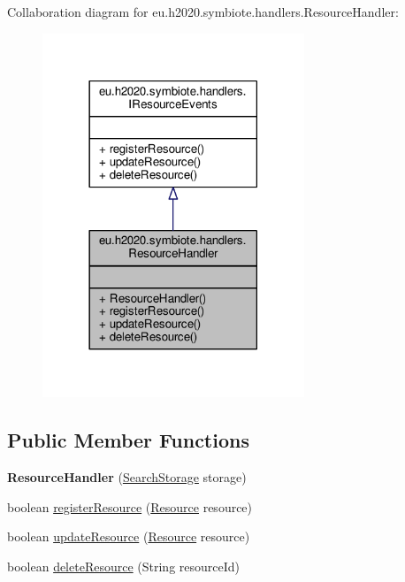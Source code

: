 Collaboration diagram for eu.\+h2020.\+symbiote.\+handlers.\+Resource\+Handler\+:
\nopagebreak
\begin{figure}[H]
\begin{center}
\leavevmode
\includegraphics[width=222pt]{classeu_1_1h2020_1_1symbiote_1_1handlers_1_1ResourceHandler__coll__graph}
\end{center}
\end{figure}
\subsection*{Public Member Functions}
\begin{DoxyCompactItemize}
\item 
{\bfseries Resource\+Handler} (\hyperlink{classeu_1_1h2020_1_1symbiote_1_1search_1_1SearchStorage}{Search\+Storage} storage)\hypertarget{classeu_1_1h2020_1_1symbiote_1_1handlers_1_1ResourceHandler_a5e5b0f79d64c3938f9ca9a4e01a2385f}{}\label{classeu_1_1h2020_1_1symbiote_1_1handlers_1_1ResourceHandler_a5e5b0f79d64c3938f9ca9a4e01a2385f}

\item 
boolean \hyperlink{classeu_1_1h2020_1_1symbiote_1_1handlers_1_1ResourceHandler_ab1eb533aab8bcc871ce752edf66ecebd}{register\+Resource} (\hyperlink{classeu_1_1h2020_1_1symbiote_1_1model_1_1Resource}{Resource} resource)
\item 
boolean \hyperlink{classeu_1_1h2020_1_1symbiote_1_1handlers_1_1ResourceHandler_abeae05c859b45f15b818a6b6640e8ad1}{update\+Resource} (\hyperlink{classeu_1_1h2020_1_1symbiote_1_1model_1_1Resource}{Resource} resource)
\item 
boolean \hyperlink{classeu_1_1h2020_1_1symbiote_1_1handlers_1_1ResourceHandler_a549c5bae3e5502b436ba353ba8b39a25}{delete\+Resource} (String resource\+Id)
\end{DoxyCompactItemize}



